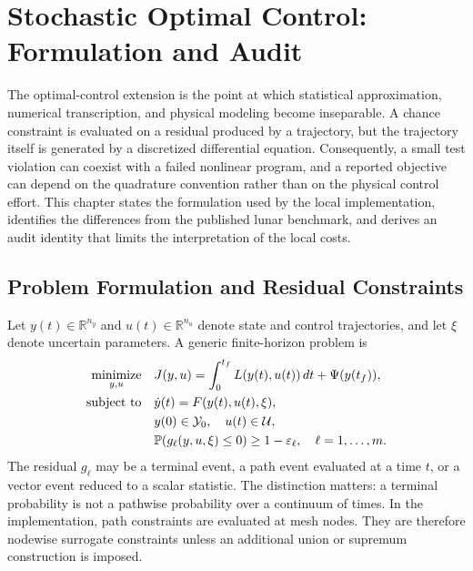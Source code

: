 \section{Stochastic Optimal Control: Formulation and Audit}
\label{ch:optimalcontrol}

The optimal-control extension is the point at which statistical approximation, numerical transcription, and physical modeling become inseparable. A chance constraint is evaluated on a residual produced by a trajectory, but the trajectory itself is generated by a discretized differential equation. Consequently, a small test violation can coexist with a failed nonlinear program, and a reported objective can depend on the quadrature convention rather than on the physical control effort. This chapter states the formulation used by the local implementation, identifies the differences from the published lunar benchmark, and derives an audit identity that limits the interpretation of the local costs.

\subsection{Problem Formulation and Residual Constraints}

Let $y(t)\in\mathbb R^{n_y}$ and $u(t)\in\mathbb R^{n_u}$ denote state and control trajectories, and let $\xi$ denote uncertain parameters. A generic finite-horizon problem is
\begin{equation}
  \begin{aligned}
    \operatorname*{minimize}_{y,u}\quad &J(y,u)=\int_0^{t_f}L(y(t),u(t))\,dt+\Psi(y(t_f)),\\
    \text{subject to}\quad &\dot y(t)=F(y(t),u(t),\xi),\\
    &y(0)\in\mathcal Y_0,\quad u(t)\in\mathcal U,\\
    &\mathbb{P}(g_\ell(y,u,\xi)\leq0)\geq1-\varepsilon_\ell,
    \quad \ell=1,\ldots,m.
  \end{aligned}
  \label{eq:ocp-general}
\end{equation}
The residual $g_\ell$ may be a terminal event, a path event evaluated at a time $t$, or a vector event reduced to a scalar statistic. The distinction matters: a terminal probability is not a pathwise probability over a continuum of times. In the implementation, path constraints are evaluated at mesh nodes. They are therefore nodewise surrogate constraints unless an additional union or supremum construction is imposed.

